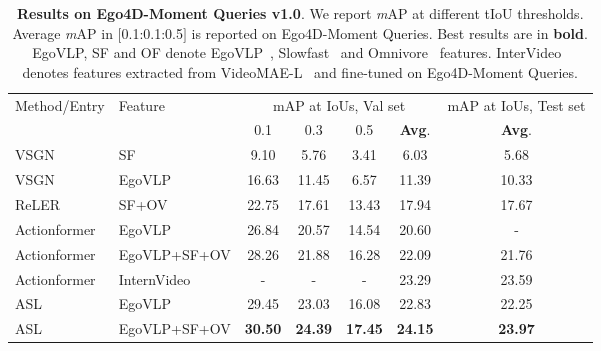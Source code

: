 \documentclass[10pt,twocolumn,letterpaper]{article}
\begin{document}
\begin{table*}[ht]
 \centering 
 \caption{\label{tab:result_ego4d} \textbf{Results on Ego4D-Moment Queries v1.0}. We report \textit{m}AP at different tIoU thresholds. Average \textit{m}AP in $[$0.1:0.1:0.5$]$ is reported on Ego4D-Moment Queries. Best results are in \textbf{bold}. EgoVLP, SF and OF denote EgoVLP~\cite{kevin2022egovlp}, Slowfast~\cite{slowfast} and Omnivore~\cite{girdhar2022omnivore} features. InterVideo~\cite{ego4dinternvideo} denotes features extracted from VideoMAE-L~\cite{tong2022videomae} and fine-tuned on Ego4D-Moment Queries.}
 \vspace{0.5em}
 \small
 {
  \begin{tabular}{l|l|cccc|c}
  \toprule
  \multirow{2}{*}{Method/Entry} & \multirow{2}{*}{Feature} & \multicolumn{4}{c}{mAP at IoUs, Val set} & \multicolumn{1}{c}{mAP at IoUs, Test set} \tabularnewline
 & & 0.1  & 0.3 & 0.5 & \textbf{Avg}. & \textbf{Avg}.   \tabularnewline
    \hline
    VSGN~\cite{vsgn} & SF & 9.10 & 5.76 & 3.41 & 6.03 & 5.68  \tabularnewline
    VSGN~\cite{kevin2022egovlp} & EgoVLP & 16.63 & 11.45 & 6.57 & 11.39 & 10.33  \tabularnewline
    ReLER~\cite{ego4dreler} & SF+OV & 22.75 & 17.61 & 13.43 & 17.94 & 17.67 \tabularnewline
    Actionformer~\cite{ego4dactionformer} & EgoVLP & 26.84 & 20.57 & 14.54 & 20.60 & - \tabularnewline
    Actionformer~\cite{ego4dactionformer} & EgoVLP+SF+OV & 28.26 & 21.88 & 16.28 & 22.09  & 21.76 \tabularnewline
    \textcolor{halfgray}{Actionformer~\cite{ego4dinternvideo}} & \textcolor{halfgray}{InternVideo} & \textcolor{halfgray}{-} & \textcolor{halfgray}{-} & \textcolor{halfgray}{-} & \textcolor{halfgray}{23.29}  & \textcolor{halfgray}{23.59}  \tabularnewline
   \hline
    ASL & EgoVLP & 29.45 & 23.03 & 16.08 & 22.83  & 22.25 \tabularnewline
    ASL & EgoVLP+SF+OV & \textbf{30.50} & \textbf{24.39} & \textbf{17.45} & \textbf{24.15} & \textbf{23.97}  \tabularnewline
 \bottomrule
  \end{tabular}
}
\end{table*}
\end{document}
